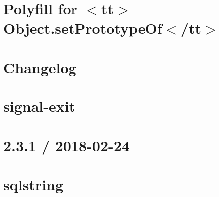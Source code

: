 \let\mypdfximage\pdfximage\def\pdfximage{\immediate\mypdfximage}\documentclass[twoside]{book}
\newcommand{\+}{\discretionary{\mbox{\scriptsize$\hookleftarrow$}}{}{}}
\begin{document}
\chapter{Polyfill for $<$tt$>$Object.\+set\+Prototype\+Of$<$/tt$>$}
\label{md__c_1__git_hub__p_r_o_y_e_c_t_o-_i_i_i-_g_o_t_rest-api-node-mysql_node_modules_setprototypeof__r_e_a_d_m_e}

\chapter{Changelog}
\label{md__c_1__git_hub__p_r_o_y_e_c_t_o-_i_i_i-_g_o_t_rest-api-node-mysql_node_modules_signal-exit__c_h_a_n_g_e_l_o_g}

\chapter{signal-\/exit}
\label{md__c_1__git_hub__p_r_o_y_e_c_t_o-_i_i_i-_g_o_t_rest-api-node-mysql_node_modules_signal-exit__r_e_a_d_m_e}

\chapter{2.3.1 / 2018-\/02-\/24}
\label{md__c_1__git_hub__p_r_o_y_e_c_t_o-_i_i_i-_g_o_t_rest-api-node-mysql_node_modules_sqlstring__h_i_s_t_o_r_y}

\chapter{sqlstring}
\label{md__c_1__git_hub__p_r_o_y_e_c_t_o-_i_i_i-_g_o_t_rest-api-node-mysql_node_modules_sqlstring__r_e_a_d_m_e}

\end{document}
